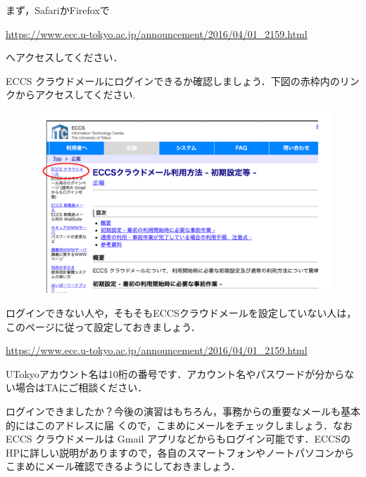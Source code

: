 \documentclass{jarticle}
\begin{document}
まず，SafariかFirefoxで
\begin{center}
 \href{https://www.ecc.u-tokyo.ac.jp/announcement/2016/04/01_2159.html}{https://www.ecc.u-tokyo.ac.jp/announcement/2016/04/01\_2159.html}
\end{center}
へアクセスしてください．

ECCS クラウドメールにログインできるか確認しましょう．下図の赤枠内のリンクからアクセスしてください.
\begin{figure}[H]
  \begin{center}
     \includegraphics[width=150mm,pagebox=cropbox,clip]{fig/eccs.png}
  \end{center}
\end{figure}

ログインできない人や，そもそもECCSクラウドメールを設定していない人は，このページに従って設定しておきましょう．
\begin{center}
  \href{https://www.ecc.u-tokyo.ac.jp/announcement/2016/04/01\_2159.html}{https://www.ecc.u-tokyo.ac.jp/announcement/2016/04/01\_2159.html}
\end{center}

UTokyoアカウント名は10桁の番号です．アカウント名やパスワードが分からない場合はTAにご相談ください．

\vspace{1em}

ログインできましたか？今後の演習はもちろん，事務からの重要なメールも基本的にはこのアドレスに届
 くので，こまめにメールをチェックしましょう．なお ECCS クラウドメールは Gmail アプリなどからもログイン可能です．ECCSのHPに詳しい説明がありますので，各自のスマートフォンやノートパソコンからこまめにメール確認できるようにしておきましょう．
\end{document}
